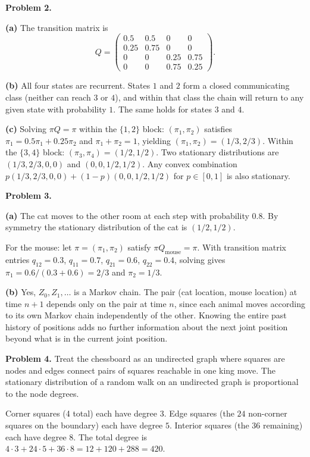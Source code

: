 \documentclass{article}
\begin{document}
\bigskip
\textbf{Problem 2.}

\textbf{(a)} The transition matrix is
$$
Q = \begin{pmatrix} 0.5 & 0.5 & 0 & 0 \\ 0.25 & 0.75 & 0 & 0 \\ 0 & 0 & 0.25 & 0.75 \\ 0 & 0 & 0.75 & 0.25 \end{pmatrix}.
$$

\textbf{(b)} All four states are recurrent. States $1$ and $2$ form a closed communicating class (neither can reach $3$ or $4$), and within that class the chain will return to any given state with probability $1$. The same holds for states $3$ and $4$.

\textbf{(c)} Solving $\pi Q=\pi$ within the $\{1,2\}$ block: $(\pi_1,\pi_2)$ satisfies $\pi_1=0.5\pi_1+0.25\pi_2$ and $\pi_1+\pi_2=1$, yielding $(\pi_1,\pi_2)=(1/3,2/3)$. Within the $\{3,4\}$ block: $(\pi_3,\pi_4)=(1/2,1/2)$. Two stationary distributions are $(1/3,2/3,0,0)$ and $(0,0,1/2,1/2)$. Any convex combination $p(1/3,2/3,0,0)+(1-p)(0,0,1/2,1/2)$ for $p\in[0,1]$ is also stationary.

\bigskip
\textbf{Problem 3.}

\textbf{(a)} The cat moves to the other room at each step with probability $0.8$. By symmetry the stationary distribution of the cat is $(1/2,1/2)$.

For the mouse: let $\pi=(\pi_1,\pi_2)$ satisfy $\pi Q_{\text{mouse}}=\pi$. With transition matrix entries $q_{12}=0.3$, $q_{11}=0.7$, $q_{21}=0.6$, $q_{22}=0.4$, solving gives $\pi_1=0.6/(0.3+0.6)=2/3$ and $\pi_2=1/3$.

\textbf{(b)} Yes, $Z_0,Z_1,\dots$ is a Markov chain. The pair (cat location, mouse location) at time $n+1$ depends only on the pair at time $n$, since each animal moves according to its own Markov chain independently of the other. Knowing the entire past history of positions adds no further information about the next joint position beyond what is in the current joint position.

\bigskip
\textbf{Problem 4.} Treat the chessboard as an undirected graph where squares are nodes and edges connect pairs of squares reachable in one king move. The stationary distribution of a random walk on an undirected graph is proportional to the node degrees.

Corner squares (4 total) each have degree $3$. Edge squares (the $24$ non-corner squares on the boundary) each have degree $5$. Interior squares (the $36$ remaining) each have degree $8$. The total degree is $4\cdot3+24\cdot5+36\cdot8=12+120+288=420$.
\end{document}

